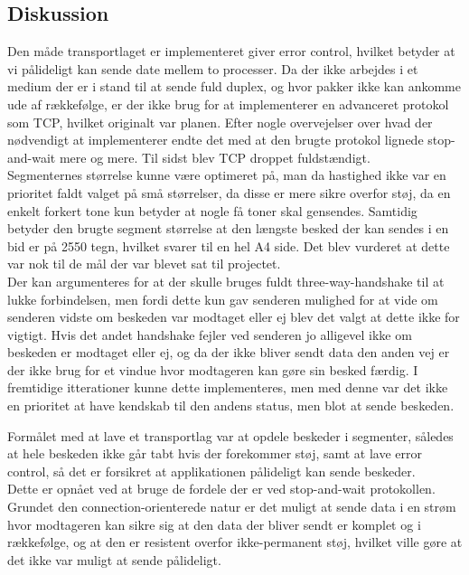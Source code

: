 \subsection{Diskussion}

Den måde transportlaget er implementeret giver error control, hvilket betyder at vi pålideligt kan sende date mellem to processer. Da der ikke arbejdes i et medium der er i stand til at sende fuld duplex, og hvor pakker ikke kan ankomme ude af rækkefølge, er der ikke brug for at implementerer en advanceret protokol som TCP, hvilket originalt var planen. Efter nogle overvejelser over hvad der nødvendigt at implementerer endte det med at den brugte protokol lignede stop-and-wait mere og mere. Til sidst blev TCP droppet fuldstændigt.
\\
Segmenternes størrelse kunne være optimeret på, man da hastighed ikke var en prioritet faldt valget på små størrelser, da disse er mere sikre overfor støj, da en enkelt forkert tone kun betyder at nogle få toner skal gensendes. Samtidig betyder den brugte segment størrelse at den længste besked der kan sendes i en bid er på 2550 tegn, hvilket svarer til en hel A4 side. Det blev vurderet at dette var nok til de mål der var blevet sat til projectet.
\\
Der kan argumenteres for at der skulle bruges fuldt three-way-handshake til at lukke forbindelsen, men fordi dette kun gav senderen mulighed for at vide om senderen vidste om beskeden var modtaget eller ej blev det valgt at dette ikke for vigtigt. Hvis det andet handshake fejler ved senderen jo alligevel ikke om beskeden er modtaget eller ej, og da der ikke bliver sendt data den anden vej er der ikke brug for et vindue hvor modtageren kan gøre sin besked færdig. I fremtidige itterationer kunne dette implementeres, men med denne var det ikke en prioritet at have kendskab til den andens status, men blot at sende beskeden.
\hfill \break


Formålet med at lave et transportlag var at opdele beskeder i segmenter, således at hele beskeden ikke går tabt hvis der forekommer støj, samt at lave error control, så det er forsikret at applikationen pålideligt kan sende beskeder.
\\
Dette er opnået ved at bruge de fordele der er ved stop-and-wait protokollen. Grundet den connection-orienterede natur er det muligt at sende data i en strøm hvor modtageren kan sikre sig at den data der bliver sendt er komplet og i rækkefølge, og at den er resistent overfor ikke-permanent støj, hvilket ville gøre at det ikke var muligt at sende pålideligt.